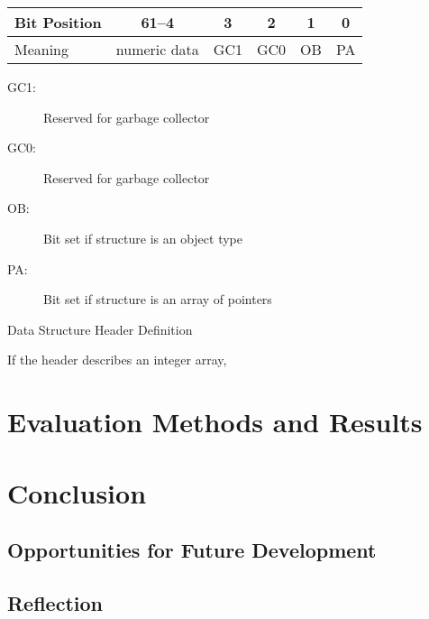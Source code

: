 		\begin{myfigure}
			\begin{tabular}{|l|c| c| c|c|c|}
				\hline
				Bit Position & 61--4 & 3 & 2 & 1 & 0 \\
				\hline
				Meaning & numeric data & GC1 & GC0 & OB & PA \\
				\hline
			\end{tabular}
			\newline
			\begin{description}
				\item[GC1:] Reserved for garbage collector
				\item[GC0:] Reserved for garbage collector
				\item[OB:] Bit set if structure is an object type
				\item[PA:] Bit set if structure is an array of pointers
			\end{description}
			
			\caption{Data Structure Header Definition}
			\label{fig:objheader}
		\end{myfigure}
		
		If the header describes an integer array, 

\chapter{Evaluation Methods and Results}

\chapter{Conclusion}
	
	\section{Opportunities for Future Development}
	
	\section{Reflection}

\bibliographysection

